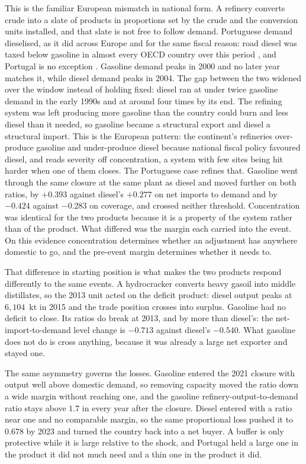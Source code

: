 \documentclass[11pt,a4paper]{article}
\begin{document}
This is the familiar European mismatch in national form. A refinery converts crude into a slate
of products in proportions set by the crude and the conversion units installed, and that slate
is not free to follow demand. Portuguese demand dieselised, as it did across Europe and for the
same fiscal reason: road diesel was taxed below gasoline in almost every OECD country over this
period \citep{harding2014diesel}, and Portugal is no exception \citep{silva2022different}.
Gasoline demand peaks in 2000 and no later year matches it, while diesel demand peaks in 2004.
The gap between the two widened over the window instead of holding fixed: diesel ran at under
twice gasoline demand in the early 1990s and at around four times by its end. The refining
system was left producing more gasoline than the country could burn and less diesel than it
needed, so gasoline became a structural export and diesel a structural import. This is the
European pattern: the continent's refineries over-produce gasoline and under-produce diesel
because national fiscal policy favoured diesel, and \citet{deboncourt2013refining} reads
severity off concentration, a system with few sites being hit harder when one of them closes.
The Portuguese case refines that. Gasoline went through the same closure at the same plant as
diesel and moved further on both ratios, by $+0.393$ against diesel's $+0.277$ on net imports to
demand and by $-0.424$ against $-0.283$ on coverage, and crossed neither threshold.
Concentration was identical for the two products because it is a property of the system rather
than of the product. What differed was the margin each carried into the event. On this evidence
concentration determines whether an adjustment has anywhere domestic to go, and the pre-event
margin determines whether it needs to.

That difference in starting position is what makes the two products respond differently to the
same events. A hydrocracker converts heavy gasoil into middle distillates, so the 2013 unit
acted on the deficit product: diesel output peaks at $6{,}104$~kt in 2015 and the trade position
crosses into surplus. Gasoline had no deficit to close. Its ratios do break at 2013, and by more
than diesel's: the net-import-to-demand level change is $-0.713$ against diesel's $-0.540$.
What gasoline does not do is cross anything, because it was already a large net exporter and
stayed one.

The same asymmetry governs the losses. Gasoline entered the 2021 closure with output well above
domestic demand, so removing capacity moved the ratio down a wide margin without reaching one, and
the gasoline refinery-output-to-demand ratio stays above $1.7$ in every year after the closure. Diesel entered
with a ratio near one and no comparable margin, so the same proportional loss pushed it to
$0.678$ by 2023 and turned the country back into a net buyer. A buffer is only protective while
it is large relative to the shock, and Portugal held a large one in the product it did not much
need and a thin one in the product it did.
\end{document}
